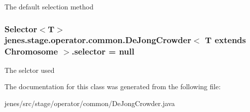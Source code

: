The default selection method \hypertarget{classjenes_1_1stage_1_1operator_1_1common_1_1_de_jong_crowder_3_01_t_01extends_01_chromosome_01_4_a6486b0225d345afd81b86dd04772d5ba}{
\subsubsection[{selector}]{\setlength{\rightskip}{0pt plus 5cm}Selector$<$T$>$ jenes.\-stage.\-operator.\-common.\-De\-Jong\-Crowder$<$ T extends Chromosome $>$.selector = null\hspace{0.3cm}{\ttfamily [protected]}}}\label{classjenes_1_1stage_1_1operator_1_1common_1_1_de_jong_crowder_3_01_t_01extends_01_chromosome_01_4_a6486b0225d345afd81b86dd04772d5ba}
The selctor used 

The documentation for this class was generated from the following file\-:\begin{DoxyCompactItemize}
\item 
jenes/src/stage/operator/common/De\-Jong\-Crowder.\-java\end{DoxyCompactItemize}
